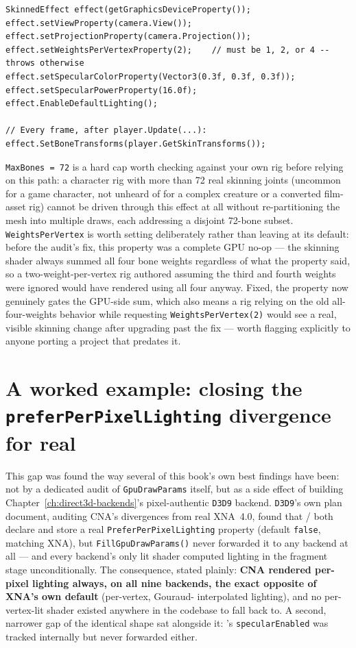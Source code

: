 \begin{lstlisting}
SkinnedEffect effect(getGraphicsDeviceProperty());
effect.setViewProperty(camera.View());
effect.setProjectionProperty(camera.Projection());
effect.setWeightsPerVertexProperty(2);    // must be 1, 2, or 4 -- throws otherwise
effect.setSpecularColorProperty(Vector3(0.3f, 0.3f, 0.3f));
effect.setSpecularPowerProperty(16.0f);
effect.EnableDefaultLighting();

// Every frame, after player.Update(...):
effect.SetBoneTransforms(player.GetSkinTransforms());
\end{lstlisting}

\texttt{MaxBones = 72} is a hard cap worth checking against your own rig before relying on this
path: a character rig with more than 72 real skinning joints (uncommon for a game character, not
unheard of for a complex creature or a converted film-asset rig) cannot be driven through this
effect at all without re-partitioning the mesh into multiple draws, each addressing a disjoint
72-bone subset. \texttt{WeightsPerVertex} is worth setting deliberately rather than leaving at
its default: before the audit's fix, this property was a complete GPU no-op --- the skinning
shader always summed all four bone weights regardless of what the property said, so a
two-weight-per-vertex rig authored assuming the third and fourth weights were ignored would
have rendered using all four anyway. Fixed, the property now genuinely gates the GPU-side sum,
which also means a rig relying on the old all-four-weights behavior while requesting
\texttt{WeightsPerVertex(2)} would see a real, visible skinning change after upgrading past the
fix --- worth flagging explicitly to anyone porting a project that predates it.

\section{A worked example: closing the \texttt{preferPerPixelLighting} divergence for real}

This gap was found the way several of this book's own best findings have been: not by a
dedicated audit of \texttt{GpuDrawParams} itself, but as a side effect of building
Chapter~\ref{ch:direct3d-backends}'s pixel-authentic \texttt{D3D9} backend. \texttt{D3D9}'s own
plan document, auditing CNA's divergences from real XNA~4.0, found that /%
 both declare and store a real \texttt{PreferPerPixelLighting} property
(default \texttt{false}, matching XNA), but \texttt{FillGpuDrawParams()} never forwarded it to
any backend at all --- and every backend's only lit shader computed lighting in the fragment
stage unconditionally. The consequence, stated plainly: \textbf{CNA rendered per-pixel lighting
always, on all nine backends, the exact opposite of XNA's own default} (per-vertex, Gouraud-%
interpolated lighting), and no per-vertex-lit shader existed anywhere in the codebase to fall
back to. A second, narrower gap of the identical shape sat alongside it:
's \texttt{specularEnabled} was tracked internally but never
forwarded either.

